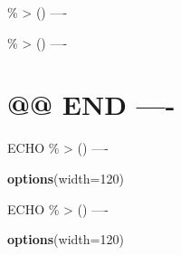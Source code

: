 \documentclass[
]{article}
\newenvironment{Shaded}{\begin{snugshade}}{\end{snugshade}}
\newcommand{\AttributeTok}[1]{\textcolor[rgb]{0.13,0.29,0.53}{#1}}
\newcommand{\DecValTok}[1]{\textcolor[rgb]{0.00,0.00,0.81}{#1}}
\newcommand{\FunctionTok}[1]{\textcolor[rgb]{0.13,0.29,0.53}{\textbf{#1}}}
\newcommand{\NormalTok}[1]{#1}
\begin{document}
\% \textbar\textgreater{} () ----

\% \textbar\textgreater{} () ----

\hypertarget{end--}{%
\section{@@ END ----}\label{end--}}

ECHO \% \textbar\textgreater{} () ----

\begin{Shaded}
\begin{Highlighting}[]
\FunctionTok{options}\NormalTok{(}\AttributeTok{width=}\DecValTok{120}\NormalTok{)}
\end{Highlighting}
\end{Shaded}

ECHO \% \textbar\textgreater{} () ----

\begin{Shaded}
\begin{Highlighting}[]
\FunctionTok{options}\NormalTok{(}\AttributeTok{width=}\DecValTok{120}\NormalTok{)}
\end{Highlighting}
\end{Shaded}
\end{document}
